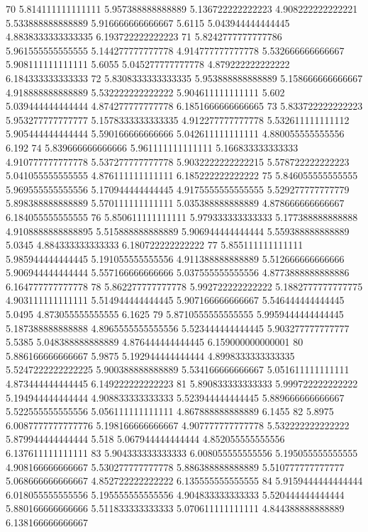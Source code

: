 70 5.814111111111111 5.957388888888889 5.136722222222223 4.908222222222221 5.533888888888889 5.916666666666667 5.6115 5.043944444444445 4.8838333333333335 6.193722222222223
71 5.8242777777777786 5.961555555555555 5.144277777777778 4.914777777777778 5.532666666666667 5.908111111111111 5.6055 5.045277777777778 4.879222222222222 6.184333333333333
72 5.8308333333333335 5.953888888888889 5.158666666666667 4.918888888888889 5.532222222222222 5.904611111111111 5.602 5.039444444444444 4.874277777777778 6.1851666666666665
73 5.833722222222223 5.953277777777777 5.1578333333333335 4.912277777777778 5.532611111111112 5.905444444444444 5.590166666666666 5.042611111111111 4.880055555555556 6.192
74 5.839666666666666 5.961111111111111 5.166833333333333 4.910777777777778 5.537277777777778 5.9032222222222215 5.578722222222223 5.041055555555555 4.876111111111111 6.185222222222222
75 5.846055555555555 5.969555555555556 5.170944444444445 4.9175555555555555 5.529277777777779 5.898388888888889 5.570111111111111 5.035388888888889 4.878666666666667 6.184055555555555
76 5.850611111111111 5.979333333333333 5.177388888888888 4.9108888888888895 5.515888888888889 5.906944444444444 5.559388888888889 5.0345 4.884333333333333 6.180722222222222
77 5.855111111111111 5.985944444444445 5.191055555555556 4.911388888888889 5.512666666666666 5.906944444444444 5.557166666666666 5.037555555555556 4.8773888888888886 6.164777777777778
78 5.862277777777778 5.992722222222222 5.1882777777777775 4.903111111111111 5.514944444444445 5.907166666666667 5.546444444444445 5.0495 4.873055555555555 6.1625
79 5.8710555555555555 5.9959444444444445 5.187388888888888 4.8965555555555556 5.523444444444445 5.903277777777777 5.5385 5.048388888888889 4.876444444444445 6.159000000000001
80 5.886166666666667 5.9875 5.192944444444444 4.8998333333333335 5.5247222222222225 5.900388888888889 5.534166666666667 5.051611111111111 4.873444444444445 6.149222222222223
81 5.890833333333333 5.999722222222222 5.194944444444444 4.908833333333333 5.523944444444445 5.889666666666667 5.522555555555556 5.056111111111111 4.867888888888889 6.1455
82 5.8975 6.0087777777777776 5.198166666666667 4.907777777777778 5.532222222222222 5.879944444444444 5.518 5.067944444444444 4.852055555555556 6.137611111111111
83 5.904333333333333 6.008055555555556 5.195055555555555 4.908166666666667 5.530277777777778 5.886388888888889 5.510777777777777 5.068666666666667 4.852722222222222 6.135555555555555
84 5.9159444444444444 6.018055555555556 5.195555555555556 4.904833333333333 5.520444444444444 5.880166666666666 5.511833333333333 5.070611111111111 4.844388888888889 6.138166666666667
